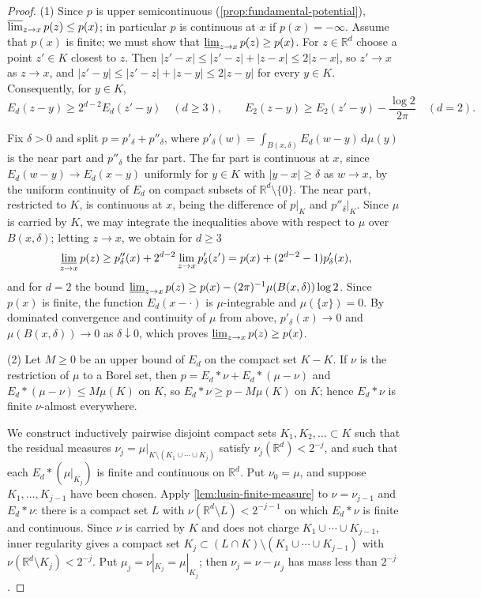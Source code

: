 \begin{proof}
(1) Since $p$ is upper semicontinuous (\cref{prop:fundamental-potential}), $\varlimsup_{z\to x}p(z)\leq p(x)$; in particular $p$ is continuous at $x$ if $p(x)=-\infty$. Assume that $p(x)$ is finite; we must show that $\varliminf_{z\to x}p(z)\geq p(x)$. For $z\in\mathbb R^d$ choose a point $z'\in K$ closest to $z$. Then $|z'-x|\leq|z'-z|+|z-x|\leq2|z-x|$, so $z'\to x$ as $z\to x$, and $|z'-y|\leq|z'-z|+|z-y|\leq2|z-y|$ for every $y\in K$. Consequently, for $y\in K$,
\[
 E_d(z-y)\geq2^{d-2}E_d(z'-y)\quad(d\geq3),\qquad
 E_2(z-y)\geq E_2(z'-y)-\frac{\log2}{2\pi}\quad(d=2).
\]

Fix $\delta>0$ and split $p=p'_\delta+p''_\delta$, where $p'_\delta(w)=\int_{B(x,\delta)}E_d(w-y)\,\mathrm d\mu(y)$ is the near part and $p''_\delta$ the far part. The far part is continuous at $x$, since $E_d(w-y)\to E_d(x-y)$ uniformly for $y\in K$ with $|y-x|\geq\delta$ as $w\to x$, by the uniform continuity of $E_d$ on compact subsets of $\mathbb R^d\setminus\{0\}$. The near part, restricted to $K$, is continuous at $x$, being the difference of $p|_K$ and $p''_\delta|_K$. Since $\mu$ is carried by $K$, we may integrate the inequalities above with respect to $\mu$ over $B(x,\delta)$; letting $z\to x$, we obtain for $d\geq3$
\[
 \varliminf_{z\to x}p(z)\geq p''_\delta(x)+2^{d-2}\lim_{z\to x}p'_\delta(z')=p(x)+(2^{d-2}-1)p'_\delta(x),
\]
and for $d=2$ the bound $\varliminf_{z\to x}p(z)\geq p(x)-(2\pi)^{-1}\mu(B(x,\delta))\log2$. Since $p(x)$ is finite, the function $E_d(x-\cdot)$ is $\mu$-integrable and $\mu(\{x\})=0$. By dominated convergence and continuity of $\mu$ from above, $p'_\delta(x)\to0$ and $\mu(B(x,\delta))\to0$ as $\delta\downarrow0$, which proves $\varliminf_{z\to x}p(z)\geq p(x)$.

(2) Let $M\geq0$ be an upper bound of $E_d$ on the compact set $K-K$. If $\nu$ is the restriction of $\mu$ to a Borel set, then $p=E_d*\nu+E_d*(\mu-\nu)$ and $E_d*(\mu-\nu)\leq M\mu(K)$ on $K$, so $E_d*\nu\geq p-M\mu(K)$ on $K$; hence $E_d*\nu$ is finite $\nu$-almost everywhere.

We construct inductively pairwise disjoint compact sets $K_1,K_2,\ldots\subset K$ such that the residual measures $\nu_j=\mu|_{K\setminus(K_1\cup\cdots\cup K_j)}$ satisfy $\nu_j(\mathbb R^d)<2^{-j}$, and such that each $E_d*(\mu|_{K_j})$ is finite and continuous on $\mathbb R^d$. Put $\nu_0=\mu$, and suppose $K_1,\ldots,K_{j-1}$ have been chosen. Apply \cref{lem:lusin-finite-measure} to $\nu=\nu_{j-1}$ and $E_d*\nu$: there is a compact set $L$ with $\nu(\mathbb R^d\setminus L)<2^{-j-1}$ on which $E_d*\nu$ is finite and continuous. Since $\nu$ is carried by $K$ and does not charge $K_1\cup\cdots\cup K_{j-1}$, inner regularity gives a compact set $K_j\subset(L\cap K)\setminus(K_1\cup\cdots\cup K_{j-1})$ with $\nu(\mathbb R^d\setminus K_j)<2^{-j}$. Put $\mu_j=\nu|_{K_j}=\mu|_{K_j}$; then $\nu_j=\nu-\mu_j$ has mass less than $2^{-j}$.


\end{proof}
